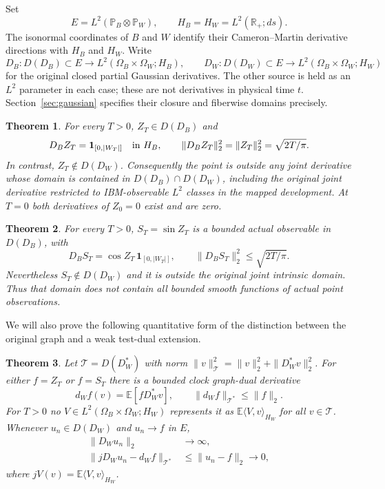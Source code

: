 \documentclass[11pt]{article}
\newtheorem{theorem}{Theorem}[section]
\newcommand{\R}{\mathbb R}\newcommand{\E}{\mathbb E}
\begin{document}
Set
\[
 E=L^2(\mathbb P_B\otimes\mathbb P_W),\qquad
 H_B=H_W=L^2(\R_+;ds).
\]
The isonormal coordinates of $B$ and $W$ identify their
Cameron--Martin derivative directions with $H_B$ and
$H_W$. Write
\[
 D_B:D(D_B)\subset E\longrightarrow L^2(\Omega_B\times\Omega_W;H_B),
 \qquad
 D_W:D(D_W)\subset E\longrightarrow L^2(\Omega_B\times\Omega_W;H_W)
\]
for the original closed partial Gaussian derivatives.
The other source is held as an $L^2$ parameter in each
case; these are not derivatives in physical time $t$.
Section~\ref{sec:gaussian} specifies their closure and
fiberwise domains precisely.

\begin{theorem}\label{thm:point}
For every $T>0$, $Z_T\in D(D_B)$ and
\begin{equation}\label{eq:sourcegradient}
 D_B Z_T=\mathbf1_{[0,|W_T|]}\quad\hbox{in }H_B,
 \qquad
 \|D_B Z_T\|_2^2=\|Z_T\|_2^2=\sqrt{2T/\pi}.
\end{equation}
In contrast, $Z_T\notin D(D_W)$. Consequently the
point is outside any joint derivative whose domain is
contained in $D(D_B)\cap D(D_W)$, including the
original joint derivative restricted to IBM-observable
$L^2$ classes in the mapped development. At $T=0$ both
derivatives of $Z_0=0$ exist and are zero.
\end{theorem}

\begin{theorem}\label{thm:bounded}
For every $T>0$, $S_T=\sin Z_T$ is a bounded actual
observable in $D(D_B)$, with
\[
 D_BS_T=\cos Z_T\,\mathbf1_{[0,|W_T|]},\qquad
 \|D_BS_T\|_2^2\leq\sqrt{2T/\pi}.
\]
Nevertheless $S_T\notin D(D_W)$ and it is outside the
original joint intrinsic domain. Thus that domain does
not contain all bounded smooth functions of actual point
observations.
\end{theorem}

We will also prove the following quantitative form of
the distinction between the original graph and a weak
test-dual extension.

\begin{theorem}\label{thm:dualpoint}
Let $\mathcal T=D(D_W^*)$ with norm
$\|v\|_{\mathcal T}^2=\|v\|_2^2+\|D_W^*v\|_2^2$.
For either $f=Z_T$ or $f=S_T$ there is a bounded clock graph-dual derivative
\[
 d_W f(v)=\E[f D_W^*v],\qquad
 \|d_W f\|_{\mathcal T^*}\leq\|f\|_2.
\]
For $T>0$ no $V\in L^2(\Omega_B\times\Omega_W;H_W)$
represents it as $\E\langle V,v\rangle_{H_W}$ for all
$v\in\mathcal T$. Whenever $u_n\in D(D_W)$ and
$u_n\to f$ in $E$,
\begin{align}
 \|D_Wu_n\|_2&\longrightarrow\infty,\label{eq:escape}\\
 \|jD_Wu_n-d_W f\|_{\mathcal T^*}
      &\leq\|u_n-f\|_2\longrightarrow0,\label{eq:dualerror}
\end{align}
where $jV(v)=\E\langle V,v\rangle_{H_W}$.
\end{theorem}
\end{document}
